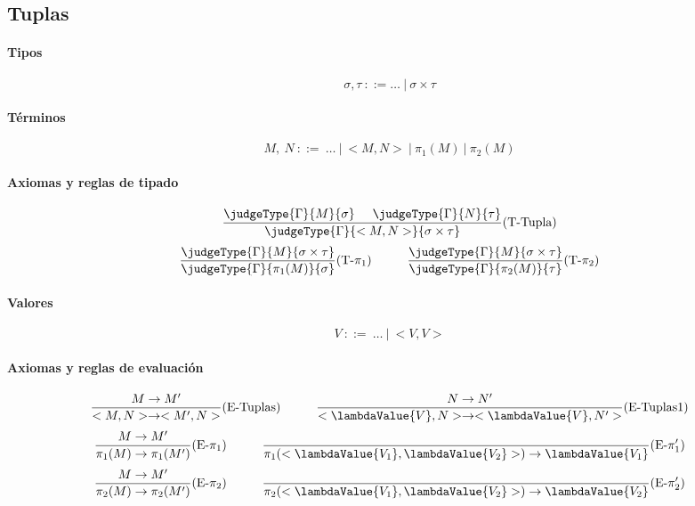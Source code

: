 \subsection{Tuplas}

\paragraph{Tipos}
\[\sigma,\tau~::= \dots~|~\sigma\times\tau\]

\paragraph{Términos}
\[M,~N~::=~\dots~|~<M,N>~|~\pi_1(M)~|~\pi_2(M)\]
\paragraph{Axiomas y reglas de tipado}
\begin{equation*}
	\frac{\judgeType{\Gamma}{M}{\sigma}\hspace*{5mm}\judgeType{\Gamma}{N}{\tau}}{\judgeType{\Gamma}{<M,N>}{\sigma\times\tau}}(\text{T-Tupla})
\end{equation*}
\vspace*{5mm}
\begin{equation*}
	\frac{\judgeType{\Gamma}{M}{\sigma\times\tau}}{\judgeType{\Gamma}{\pi_1(M)}{\sigma}}(\text{T-}\pi_1)\hspace*{1cm}\frac{\judgeType{\Gamma}{M}{\sigma\times\tau}}{\judgeType{\Gamma}{\pi_2(M)}{\tau}}(\text{T-}\pi_2)
\end{equation*}

\paragraph{Valores}
\[V~::=~\dots~|~<V,V>\]

\paragraph{Axiomas y reglas de evaluación}
\[
  \frac{M\to M'}{<M,N>\to<M',N>}(\text{E-Tuplas})\hspace*{1cm}\frac{N\to N'}{<\lambdaValue{V},N>\to<\lambdaValue{V},N'>}(\text{E-Tuplas1})
\]
\vspace*{5mm}
\begin{equation*}
	\frac{M\to M'}{\pi_1(M)\to\pi_1(M')}(\text{E-}\pi_1)\hspace*{1cm}\frac{}{\pi_1(<\lambdaValue{V_1}, \lambdaValue{V_2}>)\to\lambdaValue{V_1}}(\text{E-}\pi'_1)
\end{equation*}
\vspace*{5mm}
\begin{equation*}
	\frac{M\to M'}{\pi_2(M)\to\pi_2(M')}(\text{E-}\pi_2)\hspace*{1cm}\frac{}{\pi_2(<\lambdaValue{V_1}, \lambdaValue{V_2}>)\to\lambdaValue{V_2}}(\text{E-}\pi'_2)
\end{equation*}

